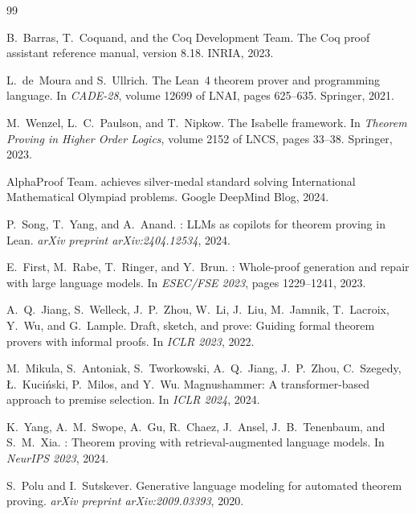 \documentclass[11pt,a4paper]{article}
\begin{document}
\begin{thebibliography}{99}

B.~Barras, T.~Coquand, and the Coq Development Team.
\newblock The {Coq} proof assistant reference manual, version 8.18.
\newblock INRIA, 2023.

L.~de~Moura and S.~Ullrich.
\newblock The {Lean~4} theorem prover and programming language.
\newblock In \emph{CADE-28}, volume 12699 of LNAI, pages 625--635. Springer, 2021.

M.~Wenzel, L.~C.~Paulson, and T.~Nipkow.
\newblock The {Isabelle} framework.
\newblock In \emph{Theorem Proving in Higher Order Logics}, volume 2152 of LNCS, pages 33--38.
Springer, 2023.

{AlphaProof Team}.
 achieves silver-medal standard solving {International Mathematical Olympiad} problems.
\newblock Google DeepMind Blog, 2024.

P.~Song, T.~Yang, and A.~Anand.
: {LLMs} as copilots for theorem proving in {Lean}.
\newblock \emph{arXiv preprint arXiv:2404.12534}, 2024.

E.~First, M.~Rabe, T.~Ringer, and Y.~Brun.
: Whole-proof generation and repair with large language models.
\newblock In \emph{ESEC/FSE 2023}, pages 1229--1241, 2023.

A.~Q.~Jiang, S.~Welleck, J.~P.~Zhou, W.~Li, J.~Liu, M.~Jamnik, T.~Lacroix,
Y.~Wu, and G.~Lample.
\newblock Draft, sketch, and prove: Guiding formal theorem provers with informal proofs.
\newblock In \emph{ICLR 2023}, 2022.

M.~Mikula, S.~Antoniak, S.~Tworkowski, A.~Q.~Jiang, J.~P.~Zhou,
C.~Szegedy, {\L}.~Kuci{\'n}ski, P.~Milos, and Y.~Wu.
\newblock Magnushammer: A transformer-based approach to premise selection.
\newblock In \emph{ICLR 2024}, 2024.

K.~Yang, A.~M.~Swope, A.~Gu, R.~Chaez, J.~Ansel, J.~B.~Tenenbaum, and
S.~M.~Xia.
: Theorem proving with retrieval-augmented language models.
\newblock In \emph{NeurIPS 2023}, 2024.

S.~Polu and I.~Sutskever.
\newblock Generative language modeling for automated theorem proving.
\newblock \emph{arXiv preprint arXiv:2009.03393}, 2020.


\end{thebibliography}
\end{document}
